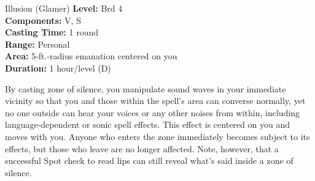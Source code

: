 {Illusion (Glamer)}
{
	\textbf{Level:}
	Brd 4\\
	\textbf{Components:}
	V, S\\
	\textbf{Casting Time:}
	1 round\\
	\textbf{Range:}
	Personal\\
	\textbf{Area:}
	5-ft.-radius emanation centered on you\\
	\textbf{Duration:}
	1 hour/level (D)\\
}
{
	By casting zone of silence, you manipulate sound waves in your immediate vicinity so that you and those within the spell's area can converse normally, yet no one outside can hear your voices or any other noises from within, including language-dependent or sonic spell effects. This effect is centered on you and moves with you. Anyone who enters the zone immediately becomes subject to its effects, but those who leave are no longer affected. Note, however, that a successful Spot check to read lips can still reveal what's said inside a zone of silence.

}
